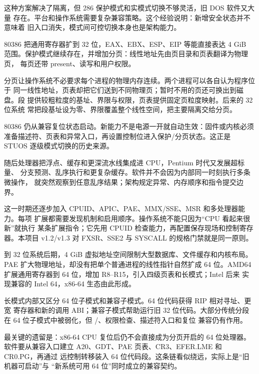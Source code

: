 这种方案解决了隔离，但 286 保护模式和实模式切换不够灵活，旧 DOS 软件又大量
存在。平台和操作系统需要复杂兼容策略。这个经验说明：新增安全状态并不意味着
旧入口消失，模式间可控切换本身也是架构能力。

80386 把通用寄存器扩到 32 位，EAX、EBX、ESP、EIP 等能直接表达 4 GiB
范围。保护模式继续存在，并增加分页：线性地址先由页目录和页表翻译为物理页，
每页还带 present、读写和用户权限。

分页让操作系统不必要求每个进程的物理内存连续。两个进程可以各自认为程序位于
同一线性地址，页表却把它们送到不同物理页；暂时不用的页还可换出到磁盘。段
提供较粗粒度的基址、界限与权限，页表提供固定页粒度映射。后来的 32 位系统
常把段基址设为零、界限覆盖整个线性空间，把主要隔离交给分页。

80386 仍从兼容复位状态启动。新能力不是电源一开就自动生效：固件或内核必须
准备描述符、页表和异常入口，再设置控制位进入保护/分页状态。这正是 STUOS
逐级模式切换的历史来源。

随后处理器把浮点、缓存和更深流水线集成进 CPU，Pentium 时代又发展超标量、
分支预测、乱序执行和更复杂缓存。软件并不会因为内部同一时刻执行多条微操作，
就突然观察到任意乱序结果；架构规定异常、内存顺序和指令提交边界。

这一时期还逐步加入 CPUID、APIC、PAE、MMX/SSE、MSR 和多处理器能力。每项
扩展都需要发现机制和启用顺序。操作系统不能只因为“CPU 看起来很新”就执行
某条扩展指令；它先用 CPUID 检查能力，再配置保存现场和控制寄存器。本项目
v1.2/v1.3 对 FXSR、SSE2 与 SYSCALL 的规格门禁就是同一原则。

到 32 位系统后期，4 GiB 虚拟地址空间限制大型数据库、文件缓存和内核布局。
PAE 扩大物理地址，却没有把单个普通进程的线性指针自然扩成 64 位。AMD64
扩展通用寄存器到 64 位，增加 R8--R15，引入四级页表和长模式；Intel 后来
实现兼容的 Intel 64，x86-64 生态由此形成。

长模式内部又区分 64 位子模式和兼容子模式。64 位代码获得 RIP 相对寻址、更宽
寄存器和新的调用 ABI；兼容子模式帮助运行旧 32 位代码。大部分传统分段在
64 位子模式中被弱化，但 /、权限检查、描述符入口和复位
兼容仍有作用。

最关键的遗留是：x86-64 CPU 复位后仍不会直接成为分页开启的 64 位处理器。
软件要从兼容入口建立 A20、GDT、PAE 页表、CR3、EFER.LME 和 CR0.PG，再通过
远控制转移装入 64 位代码段。这条链看似绕远，实际上是“旧机器可启动”与
“新系统可用 64 位”同时成立的兼容契约。

